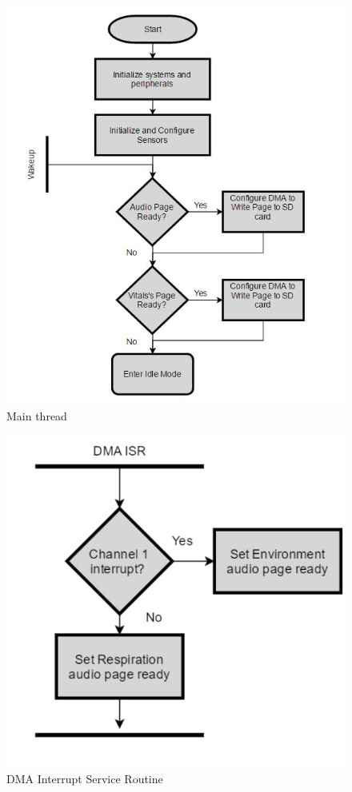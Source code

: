  \begin{figure}[h]
	\centering
	\includegraphics[scale = 1 ]{main.JPG}
	\caption{Main thread\label{main}}
\end{figure}

 \begin{figure}[h]
	\centering
	\includegraphics[scale = 0.5 ]{dma_interrupt.JPG}
	\caption{DMA Interrupt Service Routine\label{dma_isr}}
\end{figure}

